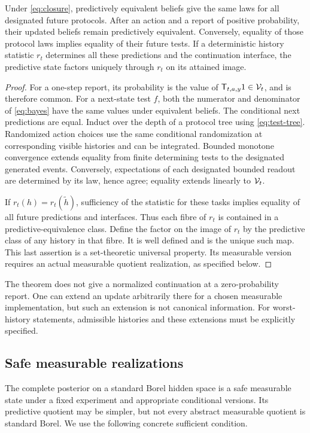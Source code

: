 \begin{theorem}\label{thm:quotient}
Under \eqref{eq:closure}, predictively equivalent beliefs give the same
laws for all designated future protocols. After an action and a report of
positive probability, their updated beliefs remain predictively equivalent.
Conversely, equality of those protocol laws implies equality of their
future tests. If a deterministic history statistic $r_t$ determines all
these predictions and the continuation interface, the predictive state
factors uniquely through $r_t$ on its attained image.
\end{theorem}
\begin{proof}
For a one-step report, its probability is the value of
$\mathsf T_{t,a,y}1\in\mathcal V_t$, and is therefore common. For a next-state
test $f$, both the numerator and denominator of \eqref{eq:bayes} have the
same values under equivalent beliefs. The conditional next predictions
are equal. Induct over the depth of a protocol tree using
\eqref{eq:test-tree}. Randomized action choices use the same conditional
randomization at corresponding visible histories and can be integrated.
Bounded monotone convergence extends equality from finite determining tests
to the designated generated events. Conversely, expectations of each
designated bounded readout are determined by its law, hence agree; equality
extends linearly to $\mathcal V_t$.

If $r_t(h)=r_t(\tilde h)$, sufficiency of the statistic for these tasks
implies equality of all future predictions and interfaces. Thus each fibre
of $r_t$ is contained in a predictive-equivalence class. Define the factor
on the image of $r_t$ by the predictive class of any history in that fibre.
It is well defined and is the unique such map. This last assertion is a
set-theoretic universal property. Its measurable version requires an actual
measurable quotient realization, as specified below.
\end{proof}

The theorem does not give a normalized continuation at a zero-probability
report. One can extend an update arbitrarily there for a chosen measurable
implementation, but such an extension is not canonical information.
For worst-history statements, admissible histories and these extensions
must be explicitly specified.

\subsection{Safe measurable realizations}
The complete posterior on a standard Borel hidden space is a safe measurable
state under a fixed experiment and appropriate conditional versions. Its
predictive quotient may be simpler, but not every abstract measurable
quotient is standard Borel. We use the following concrete sufficient
condition.

